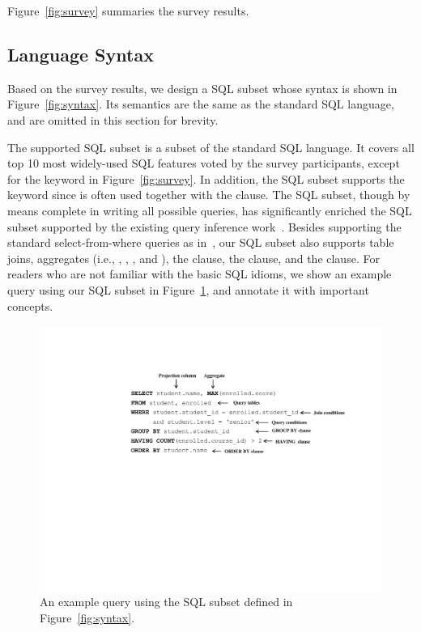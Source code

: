 Figure~\ref{fig:survey} summaries the survey results.

\subsection{Language Syntax}
\label{sec:syntax}

Based on the survey results, we design a SQL subset
whose syntax is shown in Figure~\ref{fig:syntax}.
Its semantics are the same as the standard SQL language,
and are omitted in this section for brevity.


The supported SQL subset is a subset of the standard SQL
language. It covers all top 10 most widely-used SQL
features voted by the survey participants, except for the  keyword
in Figure~\ref{fig:survey}.
In addition, the SQL subset supports the 
keyword since  is often used together with the  clause.
The SQL subset, though by means complete in writing all
possible queries, has significantly
enriched the SQL subset supported by the existing query inference
work~\cite{DasSarma:2010, Tran:2009}. Besides supporting the
standard select-from-where queries as in~\cite{DasSarma:2010, Tran:2009},
our SQL subset also supports table joins, aggregates
(i.e., , , , and ),
the  clause, the  clause,
and the  clause. For readers who are not
familiar with the basic SQL idioms, we show an example query
using our SQL subset in Figure~\ref{fig:queryex}, and annotate
it with important concepts.

\begin{figure}[t]
  \centering
  \includegraphics[scale=0.55]{queryex}
  \vspace*{-5.0ex}\caption {{\label{fig:queryex}
  An example query using the SQL subset defined in Figure~\ref{fig:syntax}.
}}

\end{figure}

